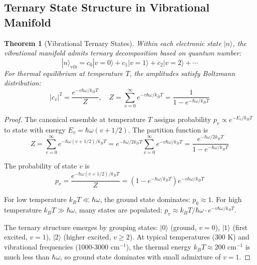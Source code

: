 \documentclass[twocolumn,10pt]{article}
\newtheorem{theorem}{Theorem}[section]
\begin{document}
\begin{figure}[!htbp]
\label{fig:esdvs_dual_mode_enhancement}
\end{figure}

\subsection{Ternary State Structure in Vibrational Manifold}

\begin{theorem}[Vibrational Ternary States]
\label{thm:vibrational_ternary}
Within each electronic state $|n\rangle$, the vibrational manifold admits ternary decomposition based on quantum number:
\begin{equation}
|n\rangle_{\text{vib}} = c_0|v=0\rangle + c_1|v=1\rangle + c_2|v=2\rangle + \cdots
\end{equation}
For thermal equilibrium at temperature $T$, the amplitudes satisfy Boltzmann distribution:
\begin{equation}
|c_v|^2 = \frac{e^{-v\hbar\omega/k_BT}}{Z}, \quad Z = \sum_{v=0}^\infty e^{-v\hbar\omega/k_BT} = \frac{1}{1 - e^{-\hbar\omega/k_BT}}
\end{equation}
\end{theorem}

\begin{proof}
The canonical ensemble at temperature $T$ assigns probability $p_v \propto e^{-E_v/k_BT}$ to state with energy $E_v = \hbar\omega(v + 1/2)$. The partition function is
\begin{equation}
Z = \sum_{v=0}^\infty e^{-\hbar\omega(v+1/2)/k_BT} = e^{-\hbar\omega/2k_BT} \sum_{v=0}^\infty e^{-v\hbar\omega/k_BT} = \frac{e^{-\hbar\omega/2k_BT}}{1 - e^{-\hbar\omega/k_BT}}
\end{equation}

The probability of state $v$ is
\begin{equation}
p_v = \frac{e^{-\hbar\omega(v+1/2)/k_BT}}{Z} = (1 - e^{-\hbar\omega/k_BT}) e^{-v\hbar\omega/k_BT}
\end{equation}

For low temperature $k_BT \ll \hbar\omega$, the ground state dominates: $p_0 \approx 1$. For high temperature $k_BT \gg \hbar\omega$, many states are populated: $p_v \approx k_BT/\hbar\omega \cdot e^{-v\hbar\omega/k_BT}$.

The ternary structure emerges by grouping states: $|0\rangle$ (ground, $v=0$), $|1\rangle$ (first excited, $v=1$), $|2\rangle$ (higher excited, $v \geq 2$). At typical temperatures (300 K) and vibrational frequencies (1000-3000 cm$^{-1}$), the thermal energy $k_BT \approx 200$ cm$^{-1}$ is much less than $\hbar\omega$, so ground state dominates with small admixture of $v=1$.
\end{proof}
\end{document}
